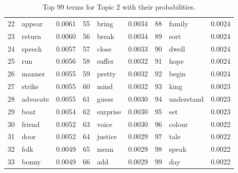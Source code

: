 \begin{table}[ht]
\begin{tabular}{rlrrlrrlr}
  22 & appear & 0.0061 & 55 & bring & 0.0034 & 88 & family & 0.0024 \\ 
  23 & return & 0.0060 & 56 & break & 0.0034 & 89 & sort & 0.0024 \\ 
  24 & speech & 0.0057 & 57 & close & 0.0033 & 90 & dwell & 0.0024 \\ 
  25 & run & 0.0056 & 58 & suffer & 0.0032 & 91 & hope & 0.0024 \\ 
  26 & manner & 0.0055 & 59 & pretty & 0.0032 & 92 & begin & 0.0024 \\ 
  27 & strike & 0.0055 & 60 & mind & 0.0032 & 93 & king & 0.0023 \\ 
  28 & advocate & 0.0055 & 61 & guess & 0.0030 & 94 & understand & 0.0023 \\ 
  29 & boat & 0.0054 & 62 & surprise & 0.0030 & 95 & set & 0.0023 \\ 
  30 & friend & 0.0052 & 63 & voice & 0.0030 & 96 & colour & 0.0022 \\ 
  31 & door & 0.0052 & 64 & justice & 0.0029 & 97 & tale & 0.0022 \\ 
  32 & folk & 0.0049 & 65 & mean & 0.0029 & 98 & speak & 0.0022 \\ 
  33 & bonny & 0.0049 & 66 & add & 0.0029 & 99 & day & 0.0022 \\ 
   \hline
\end{tabular}
\caption{\small{ Top 99 terms for Topic 2 with their probabilities.}} 
\label{topic_2_terms}
\end{table}
